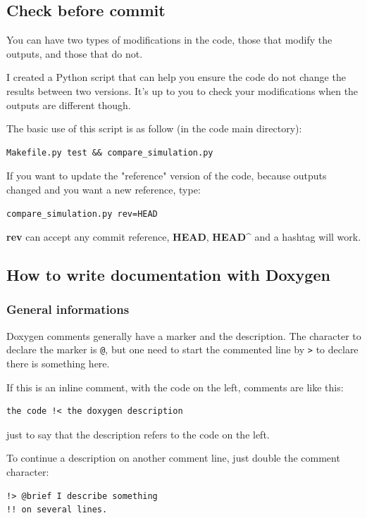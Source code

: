 \documentclass[english,a4paper,twoside]{article}
\begin{document}
\subsection{Check before commit}\label{sec:compare_simulation}
You can have two types of modifications in the code, those that modify the outputs, and those that do not.

I created a Python script  that can help you ensure the code do not change the results between two versions. It's up to you to check your modifications when the outputs are different though.

\bigskip

The basic use of this script is as follow (in the code main directory):
\begin{verbatim}
Makefile.py test && compare_simulation.py
\end{verbatim}

\bigskip

If you want to update the "reference" version of the code, because outputs changed and you want a new reference, type:
\begin{verbatim}
compare_simulation.py rev=HEAD
\end{verbatim}
\textbf{rev} can accept any commit reference, \textbf{HEAD}, \textbf{HEAD\^} and a hashtag will work.

\subsection{How to write documentation with Doxygen}
\subsubsection{General informations}
Doxygen comments generally have a marker and the description. The character to declare the marker is \verb|@|, but one need to start the commented line by \verb|>| to declare there is something here. 

If this is an inline comment, with the code on the left, comments are like this:
\begin{verbatim}
the code !< the doxygen description
\end{verbatim}
just to say that the description refers to the code on the left.

To continue a description on another comment line, just double the comment character:
\begin{verbatim}
!> @brief I describe something
!! on several lines.
\end{verbatim}
\end{document}
